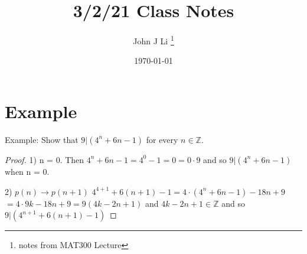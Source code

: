 \documentclass[12pt, letterpaper]{article}
\title{3/2/21 Class Notes}
\author{John J Li \thanks{notes from MAT300 Lecture}}
\date{\today}
\begin{document}

    \begin{titlepage}
        \maketitle
    \end{titlepage}


    \tableofcontents{}

    \newpage

    \section{Example}

    Example: Show that $9|(4^n + 6n-1)$ for every $n \in \mathbb{Z}$.

    \begin{proof}
        1) n = 0.
        Then $4^n+6n-1=4^0-1=0=0\cdot 9$ and so $9|(4^n+6n-1)$ when n = 0.

        2) $p(n) \rightarrow p(n+1)$ 
        $4^{4+1} + 6(n+1)-1=4 \cdot (4^n+6n-1) - 18n + 9$
        $=4\cdot 9k- 18n+9 = 9(4k-2n+1)$ and $4k-2n+1 \in \mathbb{Z}$
        and so $9|(4^{n+1}+6(n+1)-1)$
    \end{proof}
\end{document}
